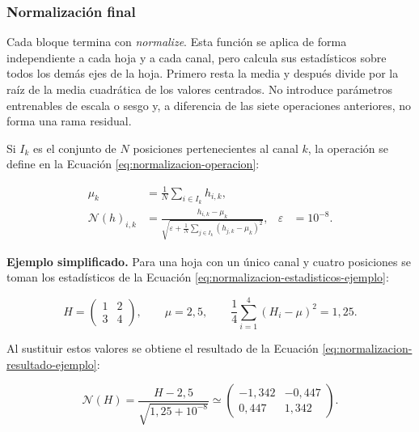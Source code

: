 \documentclass[11pt,a4paper,spanish]{book}
\numberwithin{equation}{chapter}
\numberwithin{figure}{chapter}
\begin{document}
\subsubsection{Normalización final}

Cada bloque termina con \textit{normalize}. Esta función se aplica de forma independiente a cada hoja y a cada canal, pero calcula sus
estadísticos sobre todos los demás ejes de la hoja. Primero resta la media y después divide por la raíz de la media cuadrática de los
valores centrados. No introduce parámetros entrenables de escala o sesgo y, a diferencia de las siete operaciones anteriores, no forma
una rama residual.

Si \(I_k\) es el conjunto de \(N\) posiciones pertenecientes al canal \(k\), la operación se define en la Ecuación
\eqref{eq:normalizacion-operacion}:

\begin{equation}\label{eq:normalizacion-operacion}
\begin{aligned}
\mu_k&=\frac{1}{N}\sum_{i\in I_k}h_{i,k},\\
\mathcal{N}(h)_{i,k}
 &=\frac{h_{i,k}-\mu_k}
 {\sqrt{\displaystyle\varepsilon+
 \frac{1}{N}\sum_{j\in I_k}(h_{j,k}-\mu_k)^2}},
 &\varepsilon&=10^{-8}.
\end{aligned}
\end{equation}

\textbf{Ejemplo simplificado.} Para una hoja con un único canal y cuatro posiciones se toman los estadísticos de la Ecuación
\eqref{eq:normalizacion-estadisticos-ejemplo}:

\begin{equation}\label{eq:normalizacion-estadisticos-ejemplo}
H=\begin{pmatrix}1&2\\3&4\end{pmatrix},
\qquad
\mu=2{,}5,
\qquad
\frac{1}{4}\sum_{i=1}^{4}(H_i-\mu)^2=1{,}25.
\end{equation}

Al sustituir estos valores se obtiene el resultado de la Ecuación \eqref{eq:normalizacion-resultado-ejemplo}:

\begin{equation}\label{eq:normalizacion-resultado-ejemplo}
\mathcal{N}(H)
=\frac{H-2{,}5}{\sqrt{1{,}25+10^{-8}}}
\simeq
\begin{pmatrix}
-1{,}342&-0{,}447\\
0{,}447&1{,}342
\end{pmatrix}.
\end{equation}
\end{document}
